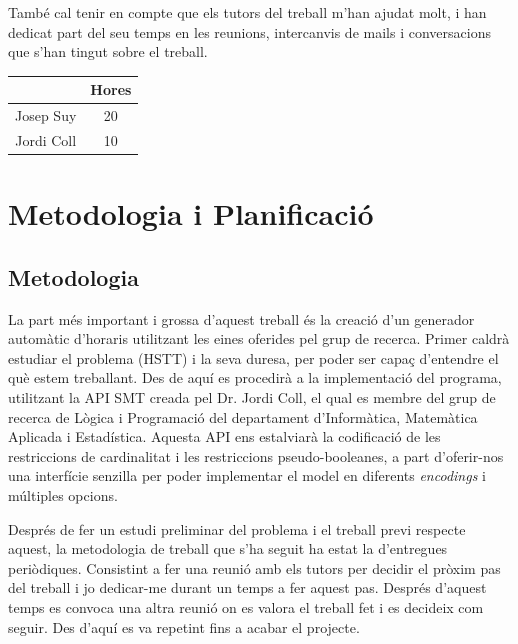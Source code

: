 \documentclass[11pt,a4paper,twoside]{report}
\begin{document}
   També cal tenir en compte que els tutors del treball m'han ajudat molt, i han dedicat part del seu temps en les reunions, intercanvis de mails i conversacions que s'han tingut sobre el treball.
   \begin{center}
    \begin{tabular}{|| c | c ||} 
    \hline
     & Hores \\ [0.5ex] 
    \hline\hline
    Josep Suy & 20 \\ [1ex] 
    Jordi Coll & 10 \\ [1ex] 
    \hline
   \end{tabular}
   \end{center}

  \chapter{Metodologia i Planificació}
  \section{Metodologia}
  La part més important i grossa d'aquest treball és la creació d'un generador automàtic d'horaris utilitzant les eines oferides pel grup de recerca. 
  Primer caldrà estudiar el problema (HSTT) i la seva duresa, per poder ser capaç d'entendre el què estem treballant.
  Des de aquí es procedirà a la implementació del programa, utilitzant la API SMT creada pel Dr. Jordi Coll, el qual es membre del grup de recerca de Lògica i Programació del departament d'Informàtica, Matemàtica Aplicada i Estadística.
  Aquesta API ens estalviarà la codificació de les restriccions de cardinalitat i les restriccions pseudo-booleanes, 
  a part d'oferir-nos una interfície senzilla per poder implementar el model en diferents \textit{encodings} i múltiples opcions.

  Després de fer un estudi preliminar del problema i el treball previ respecte aquest, la metodologia de treball que s'ha seguit ha estat la d'entregues periòdiques. 
  Consistint a fer una reunió amb els tutors per decidir el pròxim pas del treball i jo dedicar-me durant un temps a fer aquest pas. Després d'aquest temps es convoca una altra reunió on es valora el treball fet i es decideix com seguir. 
  Des d'aquí es va repetint fins a acabar el projecte.
\end{document}
